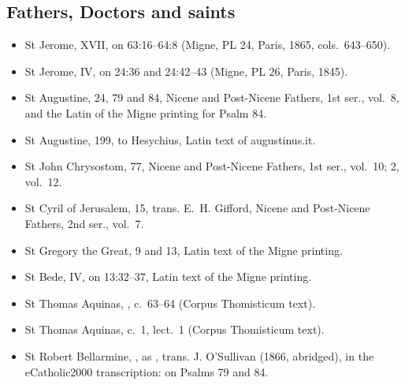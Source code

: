 {\subsection*{Fathers, Doctors and saints}
\begin{itemize}[itemsep=0pt,topsep=.25em]
\item St Jerome,  XVII, on 63:16--64:8 (Migne, PL 24, Paris, 1865, cols.~643--650).
\item St Jerome,  IV, on 24:36 and 24:42--43 (Migne, PL 26, Paris, 1845).
\item St Augustine,  24, 79 and 84, Nicene and Post-Nicene Fathers, 1st ser., vol.~8, and the Latin of the Migne printing for Psalm 84.
\item St Augustine,  199, to Hesychius, Latin text of augustinus.it.
\item St John Chrysostom,  77, Nicene and Post-Nicene Fathers, 1st ser., vol.~10;  2, vol.~12.
\item St Cyril of Jerusalem,  15, trans. E.~H. Gifford, Nicene and Post-Nicene Fathers, 2nd ser., vol.~7.
\item St Gregory the Great,  9 and 13, Latin text of the Migne printing.
\item St Bede,  IV, on 13:32--37, Latin text of the Migne printing.
\item St Thomas Aquinas, , c.~63--64 (Corpus Thomisticum text).
\item St Thomas Aquinas,  c.~1, lect.~1 (Corpus Thomisticum text).
\item St Robert Bellarmine, , as , trans. J. O'Sullivan (1866, abridged), in the eCatholic2000 transcription: on Psalms 79 and 84.
\end{itemize}
\par}
